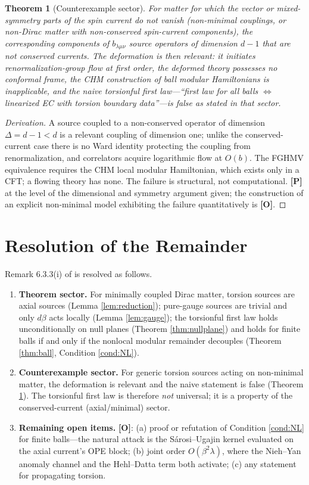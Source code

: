 \documentclass[11pt]{article}
\newtheorem{theorem}{Theorem}[section]
\theoremstyle{definition}
\newcommand{\pP}{\textbf{[P]}}
\newcommand{\pO}{\textbf{[O]}}
\begin{document}
\begin{theorem}[Counterexample sector]
\label{thm:counterexample}
For matter for which the vector or mixed-symmetry parts of the spin current
do not vanish (non-minimal couplings, or non-Dirac matter with
non-conserved spin-current components), the corresponding components of
$b_{\lambda\mu\nu}$ source operators of dimension $d-1$ that are not
conserved currents. The deformation is then \emph{relevant}: it initiates
renormalization-group flow at first order, the deformed theory possesses no
conformal frame, the CHM construction of ball modular Hamiltonians is
inapplicable, and the naive torsionful first law---``first law for all
balls $\Leftrightarrow$ linearized EC with torsion boundary data''---is
false as stated in that sector.
\end{theorem}

\begin{proof}[Derivation]
A source coupled to a non-conserved operator of dimension $\Delta=d-1<d$
is a relevant coupling of dimension one; unlike the conserved-current case
there is no Ward identity protecting the coupling from renormalization,
and correlators acquire logarithmic flow at $O(b)$. The FGHMV equivalence
requires the CHM local modular Hamiltonian, which exists only in a CFT; a
flowing theory has none. The failure is structural, not computational.
\pP{} at the level of the dimensional and symmetry argument given; the
construction of an explicit non-minimal model exhibiting the failure
quantitatively is \pO{}.
\end{proof}

\section{Resolution of the Remainder}

Remark 6.3.3(i) of \cite{McGwier2026} is resolved as follows.

\begin{enumerate}[itemsep=2pt]
\item \textbf{Theorem sector.} For minimally coupled Dirac matter, torsion
sources are axial sources (Lemma \ref{lem:reduction}); pure-gauge sources
are trivial and only $d\beta$ acts locally (Lemma \ref{lem:gauge}); the
torsionful first law holds unconditionally on null planes
(Theorem \ref{thm:nullplane}) and holds for finite balls if and only if
the nonlocal modular remainder decouples (Theorem \ref{thm:ball},
Condition \ref{cond:NL}).
\item \textbf{Counterexample sector.} For generic torsion sources acting on
non-minimal matter, the deformation is relevant and the naive statement is
false (Theorem \ref{thm:counterexample}). The torsionful first law is
therefore \emph{not} universal; it is a property of the
conserved-current (axial/minimal) sector.
\item \textbf{Remaining open items.} \pO{}: (a) proof or refutation of
Condition \ref{cond:NL} for finite balls---the natural attack is the
S\'arosi--Ugajin kernel evaluated on the axial current's OPE block;
(b) joint order $O(\beta^2\lambda)$, where the Nieh--Yan anomaly channel
and the Hehl--Datta term both activate; (c) any statement for propagating
torsion.
\end{enumerate}
\end{document}
